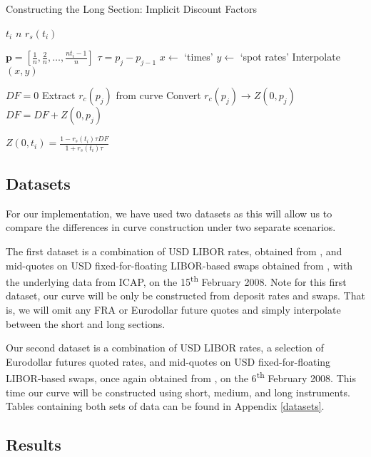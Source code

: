 \begin{algorithm}
\caption{Constructing the Long Section: Implicit Discount Factors}\label{alg:boot_zsr}
    \begin{algorithmic}[1]
    \Require $t_i$
    \Require $n$ 
    \Require $r_s(t_i)$

    \State $\textbf{p} = [\frac{1}{n}, \frac{2}{n}, \ldots, \frac{n t_i - 1}{n}]$ 
    \State $\tau = p_j - p_{j-1} $ 
    \State $x \gets$ `times'
    \State $y \gets$ `spot rates'
    \State Interpolate $(x,y)$

    \State $DF = 0$
        \State Extract $r_c(p_j)$ from curve
        \State Convert $r_c(p_j) \longrightarrow Z(0,p_j)$
        \State $DF = DF + Z(0,p_j)$ 
    \EndFor

    \State $Z(0,t_i) = \frac{1 - r_s(t_i) \tau DF}{1 + r_s(t_i) \tau}$
    \Repeat
    \end{algorithmic}
\end{algorithm}

\subsection{Datasets}
For our implementation, we have used two datasets as this will allow us to compare the differences in curve construction under two separate scenarios.

The first dataset is a combination of USD LIBOR rates, obtained from \cite{usd_libor}, and mid-quotes on USD fixed-for-floating LIBOR-based swaps obtained from \cite{flavell2012swaps}, with the underlying data from ICAP, on the 15\textsuperscript{th} February 2008. Note for this first dataset, our curve will be only be constructed from deposit rates and swaps. That is, we will omit any FRA or Eurodollar future quotes and simply interpolate between the short and long sections.

Our second dataset is a combination of USD LIBOR rates, a selection of Eurodollar futures quoted rates, and mid-quotes on USD fixed-for-floating LIBOR-based swaps, once again obtained from \cite{flavell2012swaps}, on the 6\textsuperscript{th} February 2008. This time our curve will be constructed using short, medium, and long instruments. Tables containing both sets of data can be found in Appendix \ref{datasets}.

\subsection{Results}

